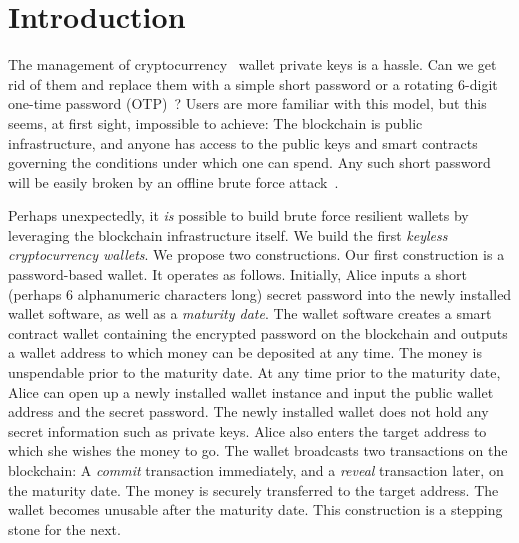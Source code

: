 \section{Introduction}

The management of cryptocurrency~\cite{bitcoin} wallet
private keys is a hassle.
Can we get rid of them and replace them with a simple short password or
a rotating $6$-digit one-time password (OTP)~\cite{rfc6238,rfc4226}? Users are more familiar with this
model, but this seems, at first sight, impossible to achieve:
The blockchain is public infrastructure, and anyone has access to the
public keys and smart contracts~\cite{buterin,wood} governing the conditions under which
one can spend. Any such short password will be easily broken by an offline
brute force attack~\cite{brain-drain}.

Perhaps unexpectedly, it \emph{is} possible to build brute force resilient wallets
by leveraging the blockchain infrastructure itself.
We build the first \emph{keyless cryptocurrency wallets}.
We propose two constructions. Our first construction is a password-based wallet.
It operates as follows.
Initially, Alice inputs a short (perhaps $6$ alphanumeric characters long) secret password into
the newly installed wallet software, as well as a \emph{maturity date}. The wallet software creates
a smart contract wallet containing the encrypted password on
the blockchain and outputs a wallet address to which money can be deposited at any time.
The money is unspendable prior to the maturity date. At any time prior to the maturity date, Alice
can open up a newly installed wallet instance and input the public wallet address and the
secret password. The newly installed wallet does not hold any secret information such as
private keys. Alice also enters the target address to which she wishes the money to go.
The wallet broadcasts two transactions on the blockchain: A \emph{commit} transaction immediately,
and a \emph{reveal} transaction later, on the maturity date. The money is securely transferred to
the target address. The wallet becomes unusable after the maturity date. This construction
is a stepping stone for the next.

